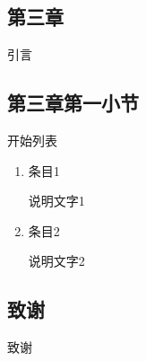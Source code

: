 \documentclass[twoside]{CUGThesis}
\begin{document}
	
	\begin{spacing}{2}
		\section{第三章}
	\end{spacing}
	引言
	\subsection{第三章第一小节}
	开始列表
	\begin{enumerate}
		\item 条目1
		
		说明文字1
		
		\item 条目2
		
		说明文字2
		
		
	\end{enumerate}
	
	
	\begin{spacing}{2}
		\section*{致谢}
	\end{spacing}
	
	致谢
	
	\clearpage
	
	
	
\end{document}
